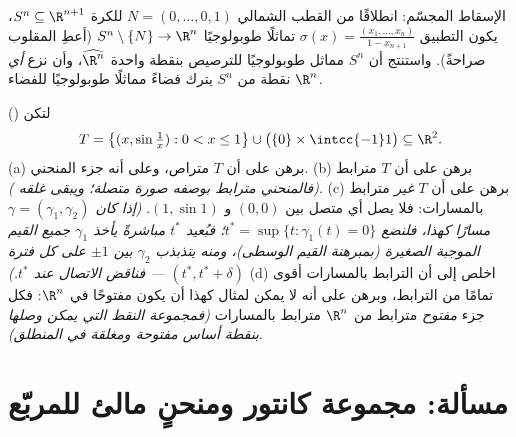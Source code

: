 \begin{exercise}[$\star\star\star$]\label{exo:b3:topology:11}
الإسقاط المجسّم: انطلاقًا من القطب الشمالي $N = (0, \dots,
0, 1)$ للكرة $S^n \subseteq \R^{n+1}$،
يكون التطبيق $\sigma(x) =
\frac{(x_1, \dots, x_n)}{1 - x_{n+1}}$ تماثلًا طوبولوجيًا $S^n
\setminus \{N\} \to \R^n$ (أعطِ المقلوب
صراحةً). واستنتج أن $S^n$ مماثل طوبولوجيًا للترصيص بنقطة واحدة
$\widehat{\R^n}$، وأن نزع \emph{أي} نقطة من $S^n$ يترك فضاءً
مماثلًا طوبولوجيًا للفضاء $\R^n$.
\end{exercise}

\begin{exercise}[$\star\star\star$]\label{exo:b3:topology:12}
() لتكن
\[
T = \bigl\{(x, \sin\tfrac1x) : 0 < x \leq 1\bigr\}
\cup \bigl(\{0\}\times\intcc{-1}1\bigr) \subseteq \R^2 .
\]
(a) برهن على أن $T$ متراص، وعلى أنه  جزء المنحني.
(b) برهن على أن $T$ مترابط \emph{(فالمنحني مترابط بوصفه صورة
متصلة؛ ويبقى غلقه )}.
(c) برهن على أن $T$ \emph{غير} مترابط بالمسارات: فلا يصل أي
 متصل بين $(0,0)$ و $(1, \sin1)$. \emph{(إذا كان $\gamma =
(\gamma_1, \gamma_2)$
مسارًا كهذا، فلنضع $t^* = \sup\{t :
\gamma_1(t) = 0\}$؛ فبُعيد $t^*$ مباشرةً يأخذ
$\gamma_1$ جميع القيم الموجبة الصغيرة (بمبرهنة القيم الوسطى)،
ومنه يتذبذب $\gamma_2$ بين $\pm1$ على كل فترة $(t^*, t^* + \delta)$ ---
فناقض الاتصال عند $t^*$.)}
(d) اخلص إلى أن الترابط بالمسارات أقوى تمامًا من الترابط، وبرهن
على أنه لا يمكن لمثال كهذا أن يكون مفتوحًا في $\R^n$: فكل جزء
\emph{مفتوح} مترابط من $\R^n$ مترابط بالمسارات \emph{(فمجموعة
النقط التي يمكن وصلها بنقطة أساس  مفتوحة ومغلقة في
المنطلق)}.
\end{exercise}

\section{مسألة: مجموعة كانتور ومنحنٍ مالئ للمربّع}

